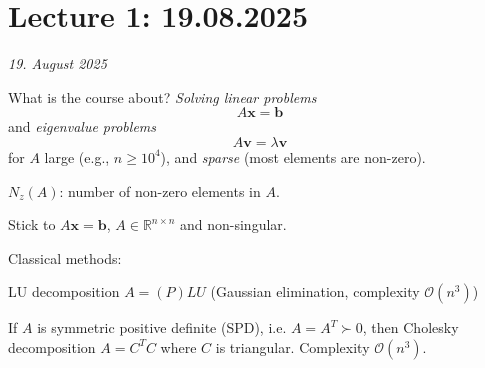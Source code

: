 \section{Lecture 1: 19.08.2025}
\textit{19. August 2025}

What is the course about? \emph{Solving linear problems}
\begin{equation}
    A\mathbf{x} = \mathbf{b}
\end{equation}
and \emph{eigenvalue problems}
\begin{equation}
    A\mathbf{v} = \lambda \mathbf{v}
\end{equation}
for $A$ large (e.g., $n \geq 10^4$), and \emph{sparse} (most elements are non-zero).

$N_z(A)$: number of non-zero elements in $A$.

Stick to $A \mathbf{x} = \mathbf{b}$, $A \in \mathbb{R}^{n \times n}$ and non-singular.

Classical methods:

LU decomposition $A = (P)LU$ (Gaussian elimination, complexity $\mathcal{O}(n^3)$)

If $A$ is symmetric positive definite (SPD), i.e. $A = A^T \succ 0$, then Cholesky decomposition $A = C^T C$ where $C$ is triangular. Complexity $\mathcal{O}(n^3)$.

